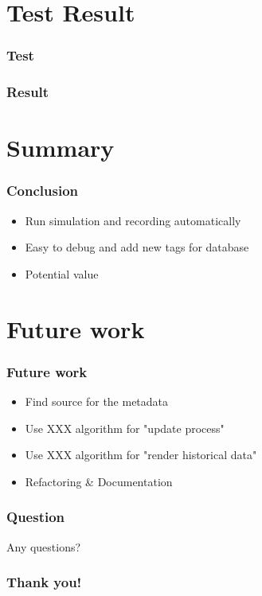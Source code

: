 \documentclass[12pt]{beamer}
\begin{document}
\section{Test Result}
\begin{frame}
\frametitle{Test}
\end{frame}

\begin{frame}
\frametitle{Result}
\end{frame}

\section{Summary}
\begin{frame}
\frametitle{Conclusion}
\begin{itemize}
\item Run simulation and recording automatically
\item Easy to debug and add new tags for database
\item Potential value
\end{itemize}
\end{frame}

\section{Future work}
\begin{frame}
\frametitle{Future work}
\begin{itemize}
\item Find source for the metadata
\item Use XXX algorithm for "update process"
\item Use XXX algorithm for "render historical data"
\item Refactoring \& Documentation
\end{itemize}
\end{frame}
 
\begin{frame}
\frametitle{Question}
Any questions?
\end{frame}
 
 
\begin{frame}
\frametitle{Thank you!}
\end{frame}
\end{document}
